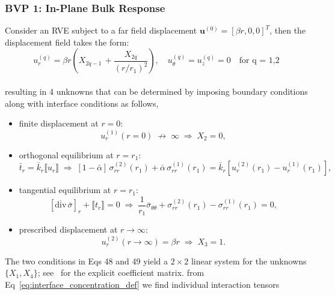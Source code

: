 \documentclass[oneside, 12pt, a4paper, bibliography=totoc]{book}
\newcommand{\jump}[1]{\llbracket #1 \rrbracket}    %
\newcommand{\bs}[1]{\bm{#1}}                       %
\begin{document}
\subsubsection{BVP 1: In-Plane Bulk Response}
Consider an RVE subject to a far field displacement $\bs{u}^{(0)} = [\beta r, 0, 0]^T$, then the displacement field takes the form:
\begin{equation}
    u_r^{(q)} = \beta r\left(X_{2q-1} \,  + \frac{X_{2q}}{(r/r_1)^2}\right), \quad u_\theta^{(q)} = u_z^{(q)} = 0 \quad  \text{for q = 1,2}
    \label{eq:ur_bulk_fiber}
\end{equation}
%
\\ resulting in 4 unknowns that can be determined by imposing boundary conditions along with interface conditions as follows, \begin{itemize}

\item finite displacement at $r=0$:
\begin{equation}
u_r^{(1)}(r=0) \;\not\to\; \infty 
\;\Rightarrow\; X_2 = 0 ,
\tag{47}
\end{equation}

\item orthogonal equilibrium at $r=r_1$:
\begin{equation}
\bar{t}_r
= \bar{k}_r \jump{u_r}
\;\Rightarrow\;
[1-\bar{\alpha}]\,\sigma_{rr}^{(2)}(r_1)
+ \bar{\alpha}\,\sigma_{rr}^{(1)}(r_1)
=
\bar{k}_r \left[u_r^{(2)}(r_1)-u_r^{(1)}(r_1)\right],
\tag{48}
\end{equation}

\item tangential equilibrium at $r=r_1$:
\begin{equation}
\left[\overline{\mathrm{div}}\,\bar{\sigma}\right]_r
+ \jump{t_r} = 0
\;\Rightarrow\;
\frac{1}{r_1}\bar{\sigma}_{\theta \theta}
+ \sigma_{rr}^{(2)}(r_1)
- \sigma_{rr}^{(1)}(r_1)
= 0 ,
\tag{49}
\end{equation}

\item prescribed displacement at $r\to\infty$:
\begin{equation}
u_r^{(2)}(r\to\infty)
= \beta r
\;\Rightarrow\;
X_3 = 1 .
\tag{50}
\end{equation}
\label{eq:egim_cca_bulk_el}
\end{itemize}
%
The two conditions in Eqs 48 and 49 yield a $2 \times 2$ linear system for the unknowns $\{X_1, X_4\}$; see~\cite{Firooz2022} for the explicit coefficient matrix.
from Eq~\ref{eq:interface_concentration_def} we find individual interaction tensors 
\end{document}
